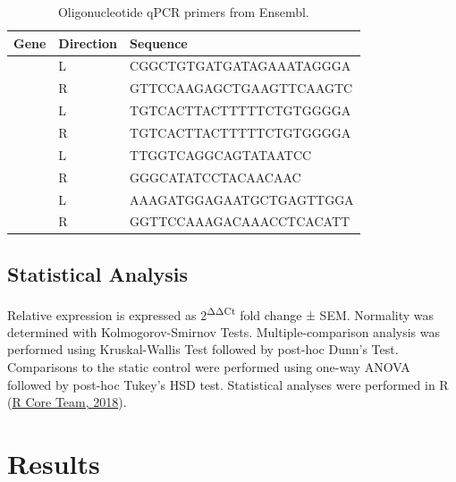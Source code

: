 \documentclass[
  12pt,
]{article}
\begin{document}
\begin{table}[!h]

\caption{\label{tab:primers}Oligonucleotide qPCR primers from Ensembl.}
\begin{tabu} to 
\toprule
Gene & Direction & Sequence\\
\midrule
 & L & CGGCTGTGATGATAGAAATAGGGA\\

 & R & GTTCCAAGAGCTGAAGTTCAAGTC\\

 & L & TGTCACTTACTTTTTCTGTGGGGA\\

 & R & TGTCACTTACTTTTTCTGTGGGGA\\

 & L & TTGGTCAGGCAGTATAATCC\\

 & R & GGGCATATCCTACAACAAC\\

 & L & AAAGATGGAGAATGCTGAGTTGGA\\

 & R & GGTTCCAAAGACAAACCTCACATT\\
\bottomrule
\end{tabu}
\end{table}

\hypertarget{statistical-analysis}{%
\subsection{Statistical Analysis}\label{statistical-analysis}}

Relative expression is expressed as 2\textsuperscript{ΔΔCt} fold change ± SEM. Normality was determined with Kolmogorov-Smirnov Tests. Multiple-comparison analysis was performed using Kruskal-Wallis Test followed by post-hoc Dunn's Test. Comparisons to the static control were performed using one-way ANOVA followed by post-hoc Tukey's HSD test. Statistical analyses were performed in R (\protect\hyperlink{ref-R}{R Core Team, 2018}).

\hypertarget{results}{%
\section{Results}\label{results}}
\end{document}
